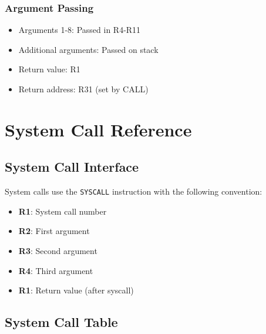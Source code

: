 \documentclass[12pt,a4paper,oneside]{book}
\newcommand{\code}[1]{\texttt{#1}}
\begin{document}
\subsection{Argument Passing}

\begin{itemize}
    \item Arguments 1-8: Passed in R4-R11
    \item Additional arguments: Passed on stack
    \item Return value: R1
    \item Return address: R31 (set by CALL)
\end{itemize}

\chapter{System Call Reference}

\section{System Call Interface}

System calls use the \code{SYSCALL} instruction with the following convention:

\begin{itemize}
    \item \textbf{R1}: System call number
    \item \textbf{R2}: First argument
    \item \textbf{R3}: Second argument  
    \item \textbf{R4}: Third argument
    \item \textbf{R1}: Return value (after syscall)
\end{itemize}

\section{System Call Table}
\end{document}
